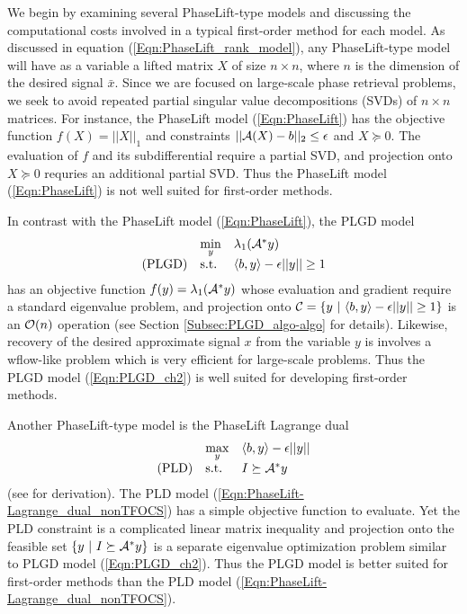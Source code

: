 We begin by examining several PhaseLift-type models and discussing the computational costs involved in a typical first-order method for each model.
As discussed in equation (\ref{Eqn:PhaseLift_rank_model}), any PhaseLift-type model will have as a variable a lifted matrix $X$ of size $n \times n$, where $n$ is the dimension of the desired signal $\bar{x}$.
Since we are focused on large-scale phase retrieval problems, we seek to avoid repeated partial singular value decompositions (SVDs) of $n \times n$ matrices.
For instance, the PhaseLift model (\ref{Eqn:PhaseLift}) has the objective function $f(X) = ||X||_1$ and constraints $||{\mathcal A}(X) - b||_2 \leq \epsilon$ and $X \succeq 0$.  
The evaluation of $f$ and its subdifferential require a partial SVD, and projection onto $X \succeq 0$ requries an additional partial SVD.
Thus the PhaseLift model (\ref{Eqn:PhaseLift}) is not well suited for first-order methods.

In contrast with the PhaseLift model (\ref{Eqn:PhaseLift}), the PLGD model 
\begin{equation} 			\label{Eqn:PLGD_ch2}
\begin{array}{lll}
	&	\min\limits_{\substack{y}}
		&	\lambda_1({\mathcal A}^* y)		\\
\textnormal{(PLGD)}
	&	\textnormal{s.t.}
		&	\langle b, y \rangle - \epsilon ||y|| \geq 1
\end{array}
\end{equation}
has an objective function $f(y) = \lambda_1({\mathcal A}^* y)$ whose evaluation and gradient require a standard eigenvalue problem, and projection onto ${\mathcal C} = \{y \ | \ \langle b, y \rangle - \epsilon ||y|| \geq 1\}$ is an ${\mathcal O}(n)$ operation (see Section \ref{Subsec:PLGD_algo-algo} for details).  Likewise, recovery of the desired approximate signal $x$ from the variable $y$ is involves a wflow-like problem which is very efficient for large-scale problems.  Thus the PLGD model (\ref{Eqn:PLGD_ch2}) is well suited for developing first-order methods.

Another PhaseLift-type model is the PhaseLift Lagrange dual
\begin{equation} 			\label{Eqn:PhaseLift-Lagrange_dual_nonTFOCS}
\begin{array}{lll}
&	\max\limits_{\substack{y}}
					&	\langle b, y \rangle - \epsilon ||y||
						\\
\textnormal{(PLD)}
				&	\textnormal{s.t.}
					&	I \succeq {\mathcal A}^*y
\end{array}
\end{equation}
(see \cite[Chapter 5]{boyd2004convex} for derivation).  The PLD model (\ref{Eqn:PhaseLift-Lagrange_dual_nonTFOCS}) has a simple objective function to evaluate.  Yet the PLD constraint is a complicated linear matrix inequality and projection onto the feasible set $\{ y \ | \ I \succeq {\mathcal A}^*y \}$ is a separate eigenvalue optimization problem similar to PLGD model (\ref{Eqn:PLGD_ch2}).  Thus the PLGD model is better suited for first-order methods than the PLD model (\ref{Eqn:PhaseLift-Lagrange_dual_nonTFOCS}).



